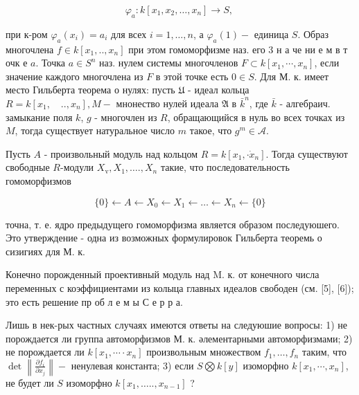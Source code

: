 \documentclass[10pt]{article}
\begin{document}
\[

\varphi_{a}: k\left[x_{1}, x_{2}, \ldots, x_{n}\right] \longrightarrow S \text {, }

\]



при к-ром $\varphi_{a}\left(x_{i}\right)=a_{i}$ для всех $i=1, \ldots, n$, а $\varphi_{a}(1)-$ единица $S$. Образ многочлена $f \in k\left[x_{1}, . ., x_{n}\right]$ при этом гомоморфизме наз. его 3 н а че ни е м в т очк е $a$. Точка $a \in S^{n}$ наз. нулем системы многочленов $F \subset k\left[x_{1}, \cdots, x_{n}\right]$, если значение каждого многочлена из $F$ в этой точке есть $0 \in S$. Для М. к. имеет место Гильберта теорема о нулях: пусть $\mathfrak{U}$ - идеал кольца $R=k\left[x_{1}, \quad . ., x_{n}\right], M-$ мнонество нулей идеала $\mathfrak{A}$ в $\bar{k}^{n}$, где $\bar{k}$ - алгебраич. замыкание поля $k$, $g$ - многочлен из $R$, обращающийся в нуль во всех точках из $M$, тогда существует натуральное число $m$ такое, что $g^{m} \in \mathcal{A}$.



Пусть $A$ - произвольный модуль над кольцом $R=k\left[x_{1}, \cdot \dot{x}_{n}\right]$. Тогда существуют свободные $R$-модули $X_{\mathrm{v}}, X_{1}, \ldots ., X_{n}$ такие, что последовательность гомоморфизмов



\[

\{0\} \longleftarrow A \longleftarrow X_{0} \longleftarrow X_{1} \longleftarrow \ldots \leftarrow X_{n} \longleftarrow\{0\}

\]



точна, т. е. ядро предыдущего гомоморфизма является образом последуюшего. Это утверждение - одна из возможных формулировок Гильберта теоремь о сизигиях для М. к.



Конечно порожденный проективный модуль над M. к. от конечного числа переменных с коэффициентами из колыца главных идеалов свободен (см. [5], [6]); это есть решение пр об л е м ы С е р р а.



Лишь в нек-рых частных случаях имеются ответы на следуюшие вопросы: 1) не порождается ли группа автоморфизмов М. к. әлементарными автоморфизмами; 2) не порождается ли $k\left[x_{1}, \cdots \cdot x_{n}\right]$ произвольным множеством $f_{1}, \ldots, f_{n}$ таким, что $\operatorname{det}\left\|\frac{\partial f_{i}}{\partial x_{j}}\right\|-$ ненулевая константа; 3) если $S \bigotimes k[y]$ изоморфно $k\left[x_{1}, \cdots, x_{n}\right]$, не будет ли $S$ изоморфно $k\left[x_{1}, \ldots . ., x_{n-1}\right]$ ?
\end{document}
